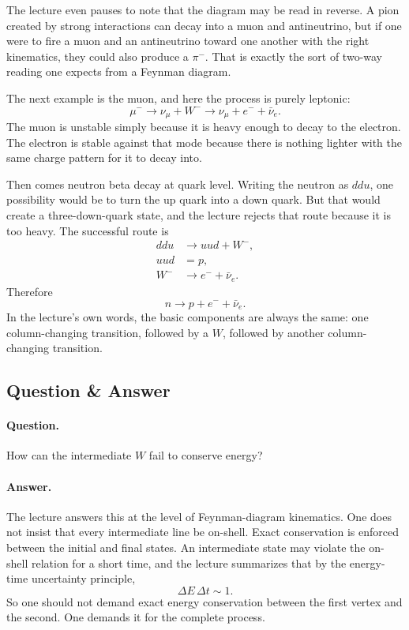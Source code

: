 The lecture even pauses to note that the diagram may be read in reverse. A pion created by strong interactions can decay into a muon and antineutrino, but if one were to fire a muon and an antineutrino toward one another with the right kinematics, they could also produce a \(\pi^-\). That is exactly the sort of two-way reading one expects from a Feynman diagram.

The next example is the muon, and here the process is purely leptonic:
\begin{equation}
\mu^- \to \nu_\mu + W^- \to \nu_\mu + e^- + \bar\nu_e.
\end{equation}
The muon is unstable simply because it is heavy enough to decay to the electron. The electron is stable against that mode because there is nothing lighter with the same charge pattern for it to decay into.

Then comes neutron beta decay at quark level. Writing the neutron as \(ddu\), one possibility would be to turn the up quark into a down quark. But that would create a three-down-quark state, and the lecture rejects that route because it is too heavy. The successful route is
\begin{align}
ddu &\to uud + W^-,\\
uud &= p,\\
W^- &\to e^-+\bar\nu_e.
\end{align}
Therefore
\begin{equation}
n\to p+e^-+\bar\nu_e.
\end{equation}
In the lecture's own words, the basic components are always the same: one column-changing transition, followed by a \(W\), followed by another column-changing transition.

\subsection{Question \& Answer}

\paragraph{Question.} How can the intermediate \(W\) fail to conserve energy?

\paragraph{Answer.} The lecture answers this at the level of Feynman-diagram kinematics. One does not insist that every intermediate line be on-shell. Exact conservation is enforced between the initial and final states. An intermediate state may violate the on-shell relation for a short time, and the lecture summarizes that by the energy-time uncertainty principle,
\begin{equation}
\Delta E\,\Delta t \sim 1.
\end{equation}
So one should not demand exact energy conservation between the first vertex and the second. One demands it for the complete process.

